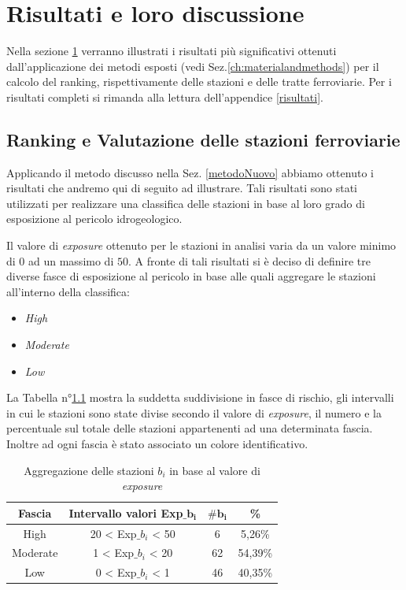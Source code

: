 \chapter{Risultati e loro discussione} 
\label{ch:risultatiediscussione} 

Nella sezione \ref{ch:risultatiediscussione} verranno illustrati i risultati più significativi ottenuti dall'applicazione dei metodi esposti (vedi Sez.\ref{ch:materialandmethods}) per il calcolo del ranking, rispettivamente delle stazioni e delle tratte ferroviarie.
Per i risultati completi si rimanda alla lettura dell'appendice \ref{risultati}.
\section{Ranking e  Valutazione delle stazioni ferroviarie}

Applicando il metodo discusso nella Sez. \ref{metodoNuovo} abbiamo ottenuto i risultati che andremo qui di seguito ad illustrare.
Tali risultati sono stati utilizzati per realizzare una classifica delle stazioni in base al loro grado di esposizione al pericolo idrogeologico.


Il valore di \textit{exposure} ottenuto per le stazioni in analisi  varia da un valore minimo di $0$ ad un massimo di $50$. A fronte di tali risultati si è deciso di definire tre diverse fasce di esposizione al pericolo in base alle quali aggregare le stazioni all'interno della classifica:
\begin{itemize}
\item \textit{High}
\item \textit{Moderate}
\item \textit{Low}
\end{itemize}
La Tabella n°\ref{range} mostra la suddetta suddivisione in fasce di rischio, gli intervalli in cui le stazioni sono state divise secondo il valore di \textit{exposure}, il numero e la percentuale sul totale delle stazioni appartenenti ad una determinata fascia. Inoltre ad ogni fascia è stato associato un colore identificativo.
\begin{table}[h]
\centering
\begin{tabular}{|c|c|c|c|}
\hline
\rowcolor{lightgray}
\textbf{Fascia} & \textbf{Intervallo valori Exp$\mathbf{\_}$$\mathbf{b_i}$} & $\mathbf{\#b_i}$ & \textbf{\%} \\
\hline
\rowcolor{flamingopink}
High & 20 < Exp$\_$$b_i$ < 50 & 6 & 5,26\%\\
\hline
\rowcolor{icterine}
Moderate & 1 < Exp$\_$$b_i$ < 20 & 62 & 54,39\%\\
\hline
\rowcolor{inchworm}
Low & $0$ < Exp$\_$$b_i$ < 1 & 46 & 40,35\%\\
\hline
\end{tabular}
\caption{Aggregazione delle stazioni $b_i$ in base al valore di \textit{exposure} }
\label{range}
\end{table}

